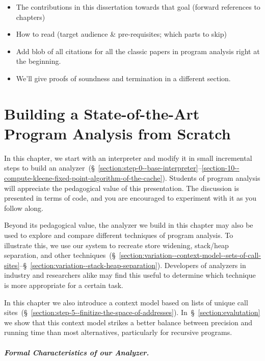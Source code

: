 \documentclass[12pt, oneside]{book}
\begin{document}
\begin{itemize}
  \item The contributions in this dissertation towards that goal (forward references to chapters)
  \item How to read (target audience \& pre-requisites; which parts to skip)
  \item Add blob of all citations for all the classic papers in program analysis right at the beginning.
  \item We’ll give proofs of soundness and termination in a different section.
\end{itemize}

\chapter{Building a State-of-the-Art Program Analysis from Scratch}
\label{section:building-a-state-of-the-art-program-analysis-from-scratch}

In this chapter, we start with an interpreter and modify it in small incremental steps to build an analyzer~(§~\ref{section:step-0--base-interpreter}–\ref{section-10--compute-kleene-fixed-point-algorithm-of-the-cache}). Students of program analysis will appreciate the pedagogical value of this presentation. The discussion is presented in terms of code, and you are encouraged to experiment with it as you follow along.

Beyond its pedagogical value, the analyzer we build in this chapter may also be used to explore and compare different techniques of program analysis. To illustrate this, we use our system to recreate store widening, stack/heap separation, and other techniques~(§~\ref{section:variation--context-model--sets-of-call-sites}–§~\ref{section:variation--stack-heap-separation}). Developers of analyzers in industry and researchers alike may find this useful to determine which technique is more appropriate for a certain task.

In this chapter we also introduce a context model based on lists of unique call sites~(§~\ref{section:step-5--finitize-the-space-of-addresses}). In~§~\ref{section:evalutation} we show that this context model strikes a better balance between precision and running time than most alternatives, particularly for recursive programs.

\paragraph{Formal Characteristics of our Analyzer.}
\end{document}
